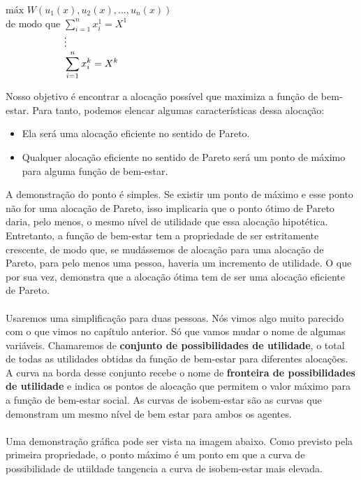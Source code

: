 \documentclass[a4paper,11pt,oneside]{book}
\theoremstyle{definition}
\theoremstyle{break}
\begin{document}
\begin{center}
	$\textrm{máx } W(u_1(x),u_2(x),...,u_n(x))$ \\
	$\textrm{de modo que } \displaystyle \sum^n_{i = 1} x^1_i = X^1$ \\
	$\textrm{\hphantom{de modo que }} \vdots$ \\
	$\textrm{\hphantom{de modo que }}\displaystyle \sum^n_{i = 1} x^k_i = X^k$
\end{center}

Nosso objetivo é encontrar a alocação possível que maximiza a função de bem-estar. Para tanto, podemos elencar algumas características dessa alocação:
\begin{itemize}
	\item Ela será uma alocação eficiente no sentido de Pareto.
	\item Qualquer alocação eficiente no sentido de Pareto será um ponto de máximo para alguma função de bem-estar.
\end{itemize}

A demonstração do ponto é simples. Se existir um ponto de máximo e esse ponto não for uma alocação de Pareto, isso implicaria que o ponto ótimo de Pareto daria, pelo menos, o mesmo nível de utilidade que essa alocação hipotética. Entretanto, a função de bem-estar tem a propriedade de ser estritamente crescente, de modo que, se mudássemos de alocação para uma alocação de Pareto, para pelo menos uma pessoa, haveria um incremento de utilidade. O que por sua vez, demonstra que a alocação ótima tem de ser uma alocação eficiente de Pareto.
\\
\\
Usaremos uma simplificação para duas pessoas. Nós vimos algo muito parecido com o que vimos no capítulo anterior. Só que vamos mudar o nome de algumas variáveis. Chamaremos de \textbf{conjunto de possibilidades de utilidade}, o total de todas as utilidades obtidas da função de bem-estar para diferentes alocações. A curva na borda desse conjunto recebe o nome de \textbf{fronteira de possibilidades de utilidade} e indica os pontos de alocação que permitem o valor máximo para a função de bem-estar social. As curvas de isobem-estar são as curvas que demonstram um mesmo nível de bem estar para ambos os agentes.
\\
\\
Uma demonstração gráfica pode ser vista na imagem abaixo. Como previsto pela primeira propriedade, o ponto máximo é um ponto em que a curva de possibilidade de utiildade tangencia a curva de isobem-estar mais elevada.
\end{document}
